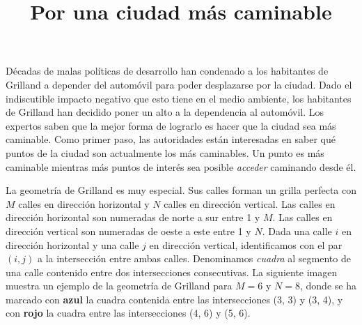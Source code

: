 \documentclass{oci}
\title{Por una ciudad más caminable}
\begin{document}
\begin{problemDescription}
  Décadas de malas políticas de desarrollo han condenado a los habitantes de Grilland a depender
  del automóvil para poder desplazarse por la ciudad.
  Dado el indiscutible impacto negativo que esto tiene en el medio ambiente, los habitantes de
  Grilland han decidido poner un alto a la dependencia al automóvil.
  Los expertos saben que la mejor forma de lograrlo es hacer que la ciudad sea más
  caminable.
  Como primer paso, las autoridades están interesadas en saber qué puntos de la ciudad son
  actualmente los más caminables.
  Un punto es más caminable mientras más puntos de interés sea posible \emph{acceder} caminando
  desde él.

  La geometría de Grilland es muy especial.
  Sus calles forman un grilla perfecta con $M$ calles en dirección horizontal
  y $N$ calles en dirección vertical.
  Las calles en dirección horizontal son numeradas de norte a sur entre 1 y $M$.
  Las calles en dirección vertical son numeradas de oeste a este entre 1 y $N$.
  Dada una calle $i$ en dirección horizontal y una calle $j$ en dirección vertical, identificamos
  con el par $(i, j)$ a la intersección entre ambas calles.
  Denominamos \emph{cuadra} al segmento de una calle contenido entre dos intersecciones consecutivas.
  La siguiente imagen muestra un ejemplo de la geometría de Grilland para $M=6$ y $N=8$, donde se
  ha marcado con {\bf\color{blue}azul} la cuadra contenida entre las intersecciones (3, 3) y (3, 4),
   y con {\bf\color{red}rojo} la cuadra entre las intersecciones (4, 6) y (5, 6).


  \begin{center}
  \end{center}


\end{problemDescription}
\end{document}
